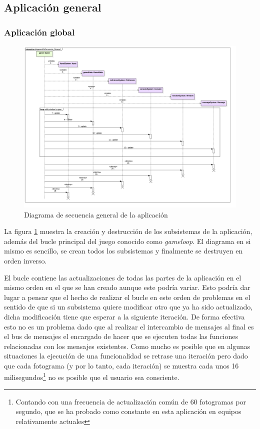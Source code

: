 \subsection{Aplicación general}

\subsubsection*{Aplicación global}

\begin{figure}
	\centerline{\includegraphics[width=19cm]{otros/UML/png/alld/png/CasosDeUso__General__Collaboration1__Interaction1__diagramaDeSecuencia_General_15.png}}
	\caption{Diagrama de secuencia general de la aplicación}
	\label{sec:general}
\end{figure}

La figura \ref{sec:general} muestra la creación y destrucción de los subsistemas de la aplicación, además del bucle principal del juego conocido como \textit{gameloop}. El diagrama en si mismo es sencillo, se crean todos los subsistemas y finalmente se destruyen en orden inverso.

\bigskip

El bucle contiene las actualizaciones de todas las partes de la aplicación en el mismo orden en el que se han creado aunque este podría variar. Esto podría dar lugar a pensar que el hecho de realizar el bucle en este orden de problemas en el sentido de que si un subsistema quiere modificar otro que ya ha sido actualizado, dicha modificación tiene que esperar a la siguiente iteración. De forma efectiva esto no es un problema dado que al realizar el intercambio de mensajes al final es el bus de mensajes el encargado de hacer que se ejecuten todas las funciones relacionadas con los mensajes existentes. Como mucho es posible que en algunas situaciones la ejecución de una funcionalidad se retrase una iteración pero dado que cada fotograma (y por lo tanto, cada iteración) se muestra cada unos 16 milisegundos\footnote{Contando con una frecuencia de actualización común de 60 fotogramas por segundo, que se ha probado como constante en esta aplicación en equipos relativamente actuales} no es posible que el usuario sea consciente.


